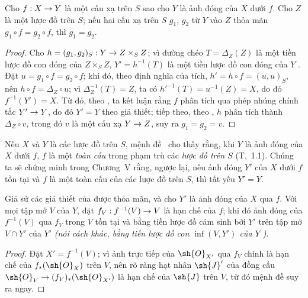 \documentclass[oneside]{amsart}
\makeatletter
\newcommand{\ega@arrow}[2]{\mathchoice{#1}{#2}{#2}{#2}}
\renewcommand{\to}{\ega@arrow{\longrightarrow}{\rightarrow}}
\newcommand{\oldpage}[2][]{{\marginnote{\normalfont\textbf{#1}~|~#2}}\ignorespaces}
\let\EGAOriginalLabel\label
\renewcommand{\label}[1]{\phantomsection\EGAOriginalLabel{#1}}
\makeatother
\begin{document}
\begin{corollary}[9.5.6]
\label{I.9.5.6}
Cho $f:X\to Y$ là một cấu xạ trên $S$ sao cho $Y$ là ảnh đóng của $X$ dưới $f$.
Cho $Z$ là một lược đồ trên $S$; nếu hai cấu xạ trên $S$ $g_1$, $g_2$ từ $Y$ vào $Z$
thỏa mãn $g_1\circ f=g_2\circ f$, thì $g_1=g_2$.
\end{corollary}

\begin{proof}
Cho $h=(g_1,g_2)_S:Y\to Z\times_S Z$; vì đường chéo $T=\Delta_Z(Z)$ là một
tiền lược đồ con đóng của $Z\times_S Z$, $Y'=h^{-1}(T)$ là một tiền lược đồ con đóng của $Y$
. Đặt $u=g_1\circ f=g_2\circ f$; khi đó, theo định nghĩa của tích,
$h'=h\circ f=(u,u)_S$, nên $h\circ f=\Delta_Z\circ u$; vì
$\Delta_Z^{-1}(T)=Z$, ta có $h'^{-1}(T)=u^{-1}(Z)=X$, do đó $f^{-1}(Y')=X$.
Từ đó, theo , ta kết luận rằng $f$ phân tích qua phép nhúng chính tắc $Y'\to Y$,
do đó $Y'=Y$ theo giả thiết; tiếp theo, theo , $h$ phân tích thành
$\Delta_Z\circ v$, trong đó $v$ là một cấu xạ $Y\to Z$, suy ra $g_1=g_2=v$.
\end{proof}

\begin{remark}[9.5.7]
\label{I.9.5.7}
Nếu $X$ và $Y$ là các lược đồ trên $S$, mệnh đề~ cho thấy rằng,
\oldpage[I]{178}
khi $Y$ là ảnh đóng của $X$ dưới $f$, $f$ là một \emph{toàn cấu} trong phạm trù các \emph{lược đồ trên $S$} (T,~1.1). Chúng ta sẽ chứng minh trong Chương~V rằng, ngược lại, nếu ảnh đóng $Y'$ của $X$ dưới $f$ tồn tại và $f$ là một toàn cấu của các lược đồ trên $S$, thì tất yếu $Y'=Y$.
\end{remark}

\begin{proposition}[9.5.8]
\label{I.9.5.8}
Giả sử các giả thiết của  được thỏa mãn, và cho $Y'$ là ảnh đóng của $X$ qua $f$. Với mọi tập mở $V$ của $Y$, đặt
$f_V:f^{-1}(V)\to V$ là hạn chế của $f$; khi đó ảnh đóng của
$f^{-1}(V)$ qua $f_V$ trong $V$ tồn tại và bằng tiền lược đồ cảm sinh bởi
$Y'$ trên tập mở $V\cap Y'$ của $Y'$ \emph{(nói cách khác, bằng tiền lược đồ con
$\inf(V,Y')$ của $Y$ )}.
\end{proposition}

\begin{proof}
Đặt $X'=f^{-1}(V)$; vì ảnh trực tiếp của $\sh{O}_{X'}$ qua
$f_V$ chính là hạn chế của $f_*(\sh{O}_X)$ trên $V$, nên rõ ràng
hạt nhân $\sh{J}'$ của đồng cấu
$\sh{O}_V\to(f_V)_*(\sh{O}_{X'})$ là hạn chế của
$\sh{J}$ trên $V$, từ đó mệnh đề suy ra ngay.
\end{proof}
\end{document}
